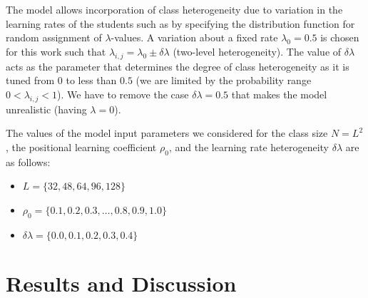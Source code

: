 \documentclass[twocolumn,secnumarabic,amssymb, nobibnotes, aps, prd]{revtex4-2}
\begin{document}
    The model allows incorporation of class heterogeneity due to variation in the learning rates of the students such as by specifying the distribution function for random assignment of $\lambda$-values.
    A variation about a fixed rate $\lambda_0=0.5$ is chosen for this work such that $\lambda_{i,j}=\lambda_0 \pm \delta\!\lambda$ (two-level heterogeneity).
    The value of $\delta\!\lambda$ acts as the parameter that determines the degree of class heterogeneity as it is tuned from $0$ to less than $0.5$ (we are limited by the probability range ${0}<\lambda_{i,j}<{1}$).
    We have to remove the case $\delta\lambda=0.5$ that makes the model unrealistic (having $\lambda=0$).


    The values of the model input parameters we considered for the class size $N=L^2$, the positional learning coefficient $\rho_0$, and the learning rate heterogeneity $\delta\lambda$ are as follows:

    \begin{itemize}
    \item $L=\lbrace32,48,64,96,128\rbrace$
    \item $\rho_0=\lbrace0.1, 0.2, 0.3,\dots, 0.8, 0.9, 1.0\rbrace$
    \item $\delta\lambda=\lbrace0.0, 0.1, 0.2, 0.3, 0.4\rbrace$
    \end{itemize}





\section{Results and Discussion}
\end{document}
